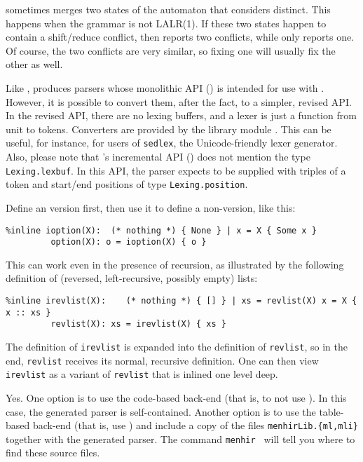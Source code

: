 \documentclass[onecolumn,11pt,nocopyrightspace,preprint]{sigplanconf}
\begin{document}
 \ocamlyacc sometimes merges two states
of the automaton that \menhir considers distinct. This happens
when the grammar is not LALR(1). If these two states happen to
contain a shift/reduce conflict, then \menhir reports two conflicts,
while \ocamlyacc only reports one. Of course, the two conflicts are
very similar, so fixing one will usually fix the other as well.

 Like \ocamlyacc, \menhir produces parsers whose monolithic API
() is intended for use with \ocamllex. However, it is
possible to convert them, after the fact, to a simpler, revised API. In the
revised API, there are no lexing buffers, and a lexer is just a function from
unit to tokens. Converters are provided by the library module
\menhirlibconvert. This can be useful, for instance, for users of
\texttt{sedlex}, the Unicode-friendly lexer generator. Also, please note that \menhir's
incremental API () does not mention the type
\verb+Lexing.lexbuf+. In this API, the parser expects to be supplied with
triples of a token and start/end positions of type \verb+Lexing.position+.

 Define an \dinline version first, then use it to
define a non-\dinline version, like this:
\begin{verbatim}
%inline ioption(X):  (* nothing *) { None } | x = X { Some x }
         option(X): o = ioption(X) { o }
\end{verbatim}
This can work even in the presence of recursion, as illustrated by the
following definition of (reversed, left-recursive, possibly empty) lists:
\begin{verbatim}
%inline irevlist(X):    (* nothing *) { [] } | xs = revlist(X) x = X { x :: xs }
         revlist(X): xs = irevlist(X) { xs }
\end{verbatim}
The definition of \verb+irevlist+ is expanded into the definition of \verb+revlist+,
so in the end, \verb+revlist+ receives its normal, recursive definition. One can
then view \verb+irevlist+ as a variant of \verb+revlist+ that is inlined one level
deep.

Yes. One option is to use the code-based back-end (that is, to not
use \otable). In this case, the generated parser is self-contained. Another
option is to use the table-based back-end (that is, use \otable) and include a
copy of the files \verb+menhirLib.{ml,mli}+ together with the generated
parser. The command \texttt{menhir \osuggestmenhirlib} will tell you where to
find these source files.
\end{document}
